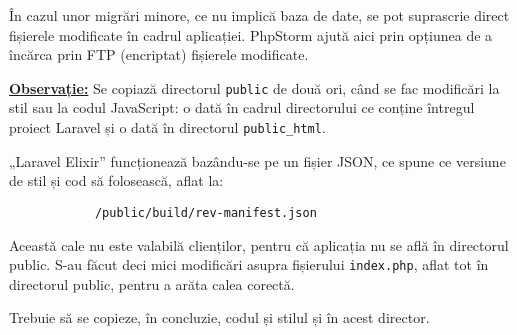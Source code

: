 		În cazul unor migrări minore, ce nu implică baza de date, se pot suprascrie direct fișierele modificate în cadrul aplicației.
		PhpStorm ajută aici prin opțiunea de a încărca prin FTP (encriptat) fișierele modificate.

		\textbf{\underline{Observație:}} Se copiază directorul \verb|public| de două ori, când se fac modificări la stil sau la codul JavaScript: o dată în cadrul directorului ce conține întregul proiect Laravel și o dată în directorul \verb|public_html|.

		„Laravel Elixir” funcționează bazându-se pe un fișier JSON, ce spune ce versiune de stil și cod să folosească, aflat la:
		\begin{verbatim}
			/public/build/rev-manifest.json
		\end{verbatim}

		Această cale nu este valabilă clienților, pentru că aplicația nu se află în directorul public.
		S-au făcut deci mici modificări asupra fișierului \verb|index.php|, aflat tot în directorul public, pentru a arăta calea corectă.

		Trebuie să se copieze, în concluzie, codul și stilul și în acest director.
